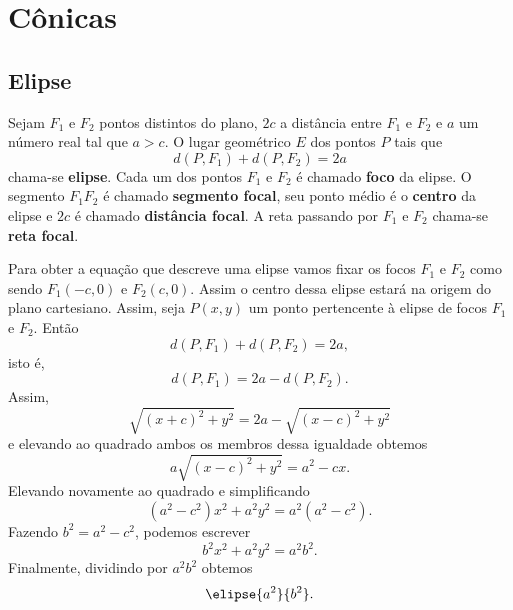 
\section{C\^onicas} %
\label{sec:conicas}

\subsection{Elipse} %
\label{sub:elipse}

\begin{definicao}
  Sejam $F_1$ e $F_2$ pontos distintos do plano, $2c$ a dist\^ancia entre $F_1$ e $F_2$ e $a$ um n\'umero real tal que $a > c$. O lugar geom\'etrico $E$ dos pontos $P$ tais que
  \begin{equation}\label{definicaoelipse}
    d(P,F_1) + d(P,F_2) = 2a
  \end{equation}
  chama-se \textbf{elipse}. Cada um dos pontos $F_1$ e $F_2$ \'e chamado \textbf{foco} da elipse. O segmento $F_1F_2$ \'e chamado \textbf{segmento focal}, seu ponto m\'edio \'e o \textbf{centro} da elipse e $2c$ \'e chamado \textbf{dist\^ancia focal}. A reta passando por $F_1$ e $F_2$ chama-se \textbf{reta focal}.   
\end{definicao}

Para obter a equa\c{c}\~ao que descreve uma elipse vamos fixar os focos $F_1$ e $F_2$ como sendo $F_1(-c,0)$ e $F_2(c,0)$. Assim o centro dessa elipse estar\'a na origem do plano cartesiano. Assim, seja $P(x,y)$ um ponto pertencente \`a elipse de focos $F_1$ e $F_2$. Ent\~ao
\begin{equation}
  d(P,F_1) + d(P,F_2) = 2a,
\end{equation}
isto \'e,
\begin{equation}
  d(P,F_1) = 2a -  d(P,F_2).
\end{equation}
Assim,
\[
  \sqrt{(x + c)^2 + y^2} = 2a - \sqrt{(x - c)^2 + y^2}
\]
e elevando ao quadrado ambos os membros dessa igualdade obtemos
\[
  a\sqrt{(x - c)^2 + y^2} = a^2 - cx.
\]
Elevando novamente ao quadrado e simplificando
\[
  (a^2 - c^2)x^2 + a^2y^2 = a^2(a^2 - c^2).
\]
Fazendo $b^2 = a^2 - c^2$, podemos escrever
\[
  b^2x^2 + a^2y^2 = a^2b^2.
\]
Finalmente, dividindo por $a^2b^2$ obtemos
\begin{equation}\label{equacaoelipse}
  \elipse{a^2}{b^2}.
\end{equation}

